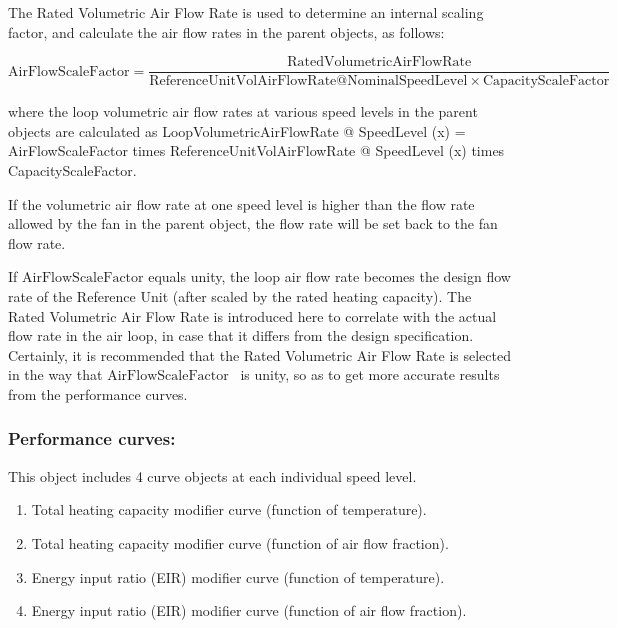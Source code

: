 The Rated Volumetric Air Flow Rate is used to determine an internal scaling factor, and calculate the air flow rates in the parent objects, as follows:

\begin{equation}
{\mathrm{AirFlowScaleFactor}} = \frac{{{\mathrm{RatedVolumetricAirFlowRate}}}}{{{\mathrm{ReferenceUnitVolAirFlowRate}}@{\mathrm{NominalSpeedLevel}} \times {\mathrm{CapacityScaleFactor}}}}
\end{equation}

where the loop volumetric air flow rates at various speed levels in the parent objects are calculated as LoopVolumetricAirFlowRate @ SpeedLevel (x) = AirFlowScaleFactor times ReferenceUnitVolAirFlowRate @ SpeedLevel (x) times CapacityScaleFactor.

If the volumetric air flow rate at one speed level is higher than the flow rate allowed by the fan in the parent object, the flow rate will be set back to the fan flow rate.

If \({\mathrm{AirFlowScaleFactor}}\) equals unity, the loop air flow rate becomes the design flow rate of the Reference Unit (after scaled by the rated heating capacity). The Rated Volumetric Air Flow Rate is introduced here to correlate with the actual flow rate in the air loop, in case that it differs from the design specification. Certainly, it is recommended that the Rated Volumetric Air Flow Rate is selected in the way that \({\mathrm{AirFlowScaleFactor}}\) ~is unity, so as to get more accurate results from the performance curves.

\subsubsection{Performance curves:}\label{performance-curves-201605050922}

This object includes 4 curve objects at each individual speed level.

\begin{enumerate}
\item Total heating capacity modifier curve (function of temperature).
\item Total heating capacity modifier curve (function of air flow fraction).
\item Energy input ratio (EIR) modifier curve (function of temperature).
\item Energy input ratio (EIR) modifier curve (function of air flow fraction).
\end{enumerate}

